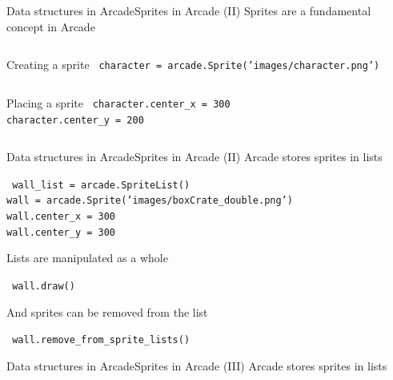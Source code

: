 \documentclass[10pt,compress]{beamer} %
\begin{document}
{\begin{frame}{Data structures in Arcade}{Sprites in Arcade (II)}
	Sprites are a fundamental concept in Arcade
    
    \begin{columns}
 	   \column{\textwidth}
		\begin{exampleblock}{Creating a sprite}
        \texttt{
        character = arcade.Sprite('images/character.png')
        }
		\end{exampleblock}
    \end{columns}

    \begin{columns}
		\begin{exampleblock}{Placing a sprite}
        \texttt{
        character.center\_x = 300\\
        character.center\_y = 200}
		\end{exampleblock}

    \end{columns}
\end{frame}

\begin{frame}{Data structures in Arcade}{Sprites in Arcade (II)}
	Arcade stores sprites in lists
    
		\begin{exampleblock}{}
        \texttt{
        wall\_list = arcade.SpriteList()\\
        wall = arcade.Sprite('images/boxCrate\_double.png')\\
        wall.center\_x = 300\\
        wall.center\_y = 300}
		\end{exampleblock}

       Lists are manipulated as a whole

		\begin{exampleblock}{}
        \texttt{
        wall.draw()
        }
		\end{exampleblock}

    And sprites can be removed from the list
		\begin{exampleblock}{}
        \texttt{
        wall.remove\_from\_sprite\_lists()
        }
		\end{exampleblock}
\end{frame}

\begin{frame}{Data structures in Arcade}{Sprites in Arcade (III)}
	Arcade stores sprites in lists
    

\end{frame}}
\end{document}
